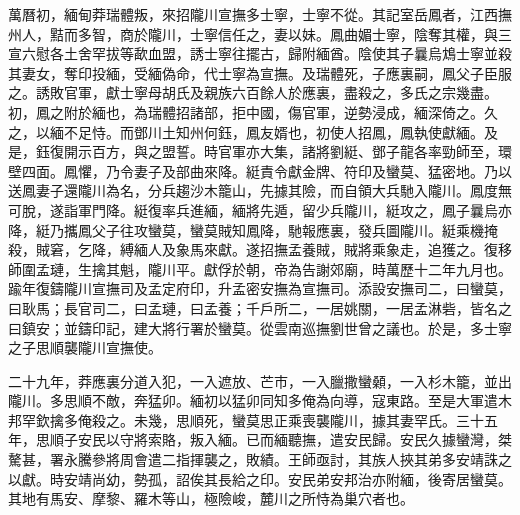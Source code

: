 \begin{pinyinscope}
萬曆初，緬甸莽瑞體叛，來招隴川宣撫多士寧，士寧不從。其記室岳鳳者，江西撫州人，黠而多智，商於隴川，士寧信任之，妻以妹。鳳曲媚士寧，陰奪其權，與三宣六慰各土舍罕拔等歃血盟，誘士寧往擺古，歸附緬酋。陰使其子曩烏鴆士寧並殺其妻女，奪印投緬，受緬偽命，代士寧為宣撫。及瑞體死，子應裏嗣，鳳父子臣服之。誘敗官軍，獻士寧母胡氏及親族六百餘人於應裏，盡殺之，多氏之宗幾盡。初，鳳之附於緬也，為瑞體招諸部，拒中國，傷官軍，逆勢浸成，緬深倚之。久之，以緬不足恃。而鄧川土知州何鈺，鳳友婿也，初使人招鳳，鳳執使獻緬。及是，鈺復開示百方，與之盟誓。時官軍亦大集，諸將劉綎、鄧子龍各率勁師至，環壁四面。鳳懼，乃令妻子及部曲來降。綎責令獻金牌、符印及蠻莫、猛密地。乃以送鳳妻子還隴川為名，分兵趨沙木籠山，先據其險，而自領大兵馳入隴川。鳳度無可脫，遂詣軍門降。綎復率兵進緬，緬將先遁，留少兵隴川，綎攻之，鳳子曩烏亦降，綎乃攜鳳父子往攻蠻莫，蠻莫賊知鳳降，馳報應裏，發兵圖隴川。綎乘機掩殺，賊窘，乞降，縛緬人及象馬來獻。遂招撫孟養賊，賊將乘象走，追獲之。復移師圍孟璉，生擒其魁，隴川平。獻俘於朝，帝為告謝郊廟，時萬歷十二年九月也。踰年復鑄隴川宣撫司及孟定府印，升孟密安撫為宣撫司。添設安撫司二，曰蠻莫，曰耿馬；長官司二，曰孟璉，曰孟養；千戶所二，一居姚關，一居孟淋砦，皆名之曰鎮安；並鑄印記，建大將行署於蠻莫。從雲南巡撫劉世曾之議也。於是，多士寧之子思順襲隴川宣撫使。

二十九年，莽應裏分道入犯，一入遮放、芒市，一入臘撒蠻顙，一入杉木籠，並出隴川。多思順不敵，奔猛卯。緬初以猛卯同知多俺為向導，寇東路。至是大軍遣木邦罕欽擒多俺殺之。未幾，思順死，蠻莫思正乘喪襲隴川，據其妻罕氏。三十五年，思順子安民以守將索賂，叛入緬。已而緬聽撫，遣安民歸。安民久據蠻灣，桀驁甚，署永騰參將周會遣二指揮襲之，敗績。王師亟討，其族人挾其弟多安靖誅之以獻。時安靖尚幼，勢孤，詔俟其長給之印。安民弟安邦治亦附緬，後寄居蠻莫。其地有馬安、摩黎、羅木等山，極險峻，麓川之所恃為巢穴者也。


\end{pinyinscope}